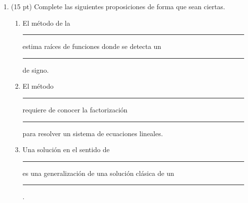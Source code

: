 \documentclass[11pt]{article}
\begin{document}
\begin{enumerate}
\begin{enumerate}
\vspace{1cm}
\item (15 pt) Complete las siguientes proposiciones de forma que sean ciertas.

\vspace{1cm}
\begin{enumerate}
	\item El m\'etodo de la \rule{5cm}{0.4pt} estima ra\'ices de funciones donde se detecta un \rule{5cm}{0.4pt} de signo.
    \item \vspace{5mm} El m\'etodo \rule{5cm}{0.4pt} requiere de conocer la factorizaci\'on \rule{5cm}{0.4pt} para resolver un sistema de ecuaciones lineales.
    \item \vspace{5mm} Una soluci\'on en el sentido de \rule{5cm}{0.4pt} es una generalizaci\'on de una soluci\'on cl\'asica de un \rule{5cm}{0.4pt}.
\end{enumerate}
\end{enumerate}
\end{enumerate}
\end{document}
